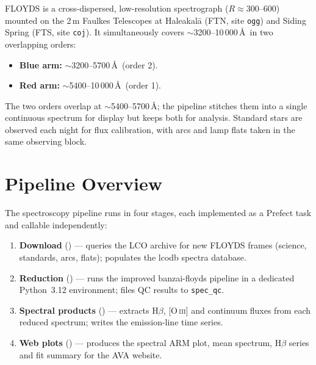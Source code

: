 \documentclass[a4paper,12pt]{article}
\begin{document}
FLOYDS is a cross-dispersed, low-resolution spectrograph ($R \approx 300$--600)
mounted on the 2\,m Faulkes Telescopes at Haleakal\={a} (FTN, site \texttt{ogg})
and Siding Spring (FTS, site \texttt{coj}).  It simultaneously covers
$\sim$3200--10\,000\,\AA\ in two overlapping orders:
\begin{itemize}
  \item \textbf{Blue arm:} $\sim$3200--5700\,\AA\ (order 2).
  \item \textbf{Red arm:}  $\sim$5400--10\,000\,\AA\ (order 1).
\end{itemize}
The two orders overlap at $\sim$5400--5700\,\AA; the pipeline stitches them
into a single continuous spectrum for display but keeps both for analysis.
Standard stars are observed each night for flux calibration, with arcs and lamp
flats taken in the same observing block.

\section{Pipeline Overview}
\label{sec:overview}

The spectroscopy pipeline runs in four stages, each implemented as a Prefect
task and callable independently:

\begin{enumerate}
  \item \textbf{Download} () ---
        queries the LCO archive for new FLOYDS frames (science, standards,
        arcs, flats); populates the lcodb spectra database.
  \item \textbf{Reduction} () ---
        runs the improved banzai-floyds pipeline in a dedicated Python~3.12
        environment; files QC results to \texttt{spec\_qc}.
  \item \textbf{Spectral products} () ---
        extracts H$\beta$, [O\,\textsc{iii}] and continuum fluxes from each
        reduced spectrum; writes the emission-line time series.
  \item \textbf{Web plots} () ---
        produces the spectral ARM plot, mean spectrum, H$\beta$ series and
        fit summary for the AVA website.
\end{enumerate}

\end{document}
